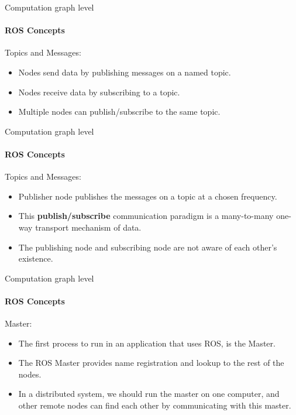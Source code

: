 \documentclass{beamer}
\begin{document}
\begin{frame}{Computation graph level}
    \framesubtitle{ROS Concepts}
    {\huge Topics and Messages:}
    \vspace{1cm}
    \begin{itemize}
        \item Nodes send data by publishing messages on a named topic.
        
        \item Nodes receive data by subscribing to a topic.
        
        \item Multiple nodes can publish/subscribe to the same topic.

    \end{itemize}
\end{frame}

\begin{frame}{Computation graph level}
    \framesubtitle{ROS Concepts}
    {\huge Topics and Messages:}
    \vspace{1cm}
    \begin{itemize}
        \item Publisher node publishes the messages on a topic at a chosen frequency.
        
        \item This \textbf{publish/subscribe} communication paradigm is a many-to-many one-way transport mechanism of data.
        
        \item The publishing node and subscribing node are not aware of each other's existence. 
    \end{itemize}
\end{frame}



\begin{frame}{Computation graph level}
    \framesubtitle{ROS Concepts}
    {\huge Master:}
    \vspace{1cm}
    \begin{itemize}
        \item The first process to run in an application that uses ROS, is the Master.
        
        \item The ROS Master provides name registration and lookup to the rest
        of the nodes.
        
        \item In a distributed system, we should run the master on one computer,
        and other remote nodes can find each other by communicating with
        this master.
    \end{itemize}
\end{frame}
\end{document}
